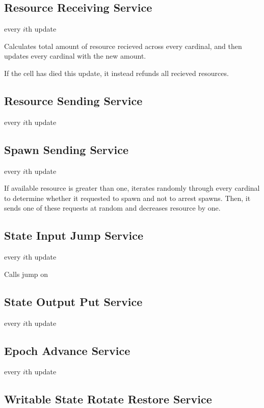 \subsection{Resource Receiving Service}

every $i$th update

Calculates total amount of resource recieved across every cardinal, and then updates every cardinal with the new amount.

If the cell has died this update, it instead refunds all recieved resources.

\subsection{Resource Sending Service}

every $i$th update

\subsection{Spawn Sending Service}

every $i$th update

If available resource is greater than one, iterates randomly through every cardinal to determine whether it requested to spawn and not to arrest spawns.
Then, it sends one of these requests at random and decreases resource by one.

\subsection{State Input Jump Service}

every $i$th update

Calls jump on

\subsection{State Output Put Service}

every $i$th update

\subsection{Epoch Advance Service}

every $i$th update

\subsection{Writable State Rotate Restore Service}

